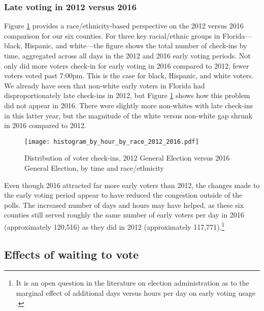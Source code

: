 \documentclass[12pt,titlepage]{article}
\begin{document}
\subsubsection*{Late voting in 2012 versus 2016}

Figure \ref{fig:race2012and2016} provides a race/ethnicity-based
perspective on the 2012 versus 2016 comparison for our six counties.
For three key racial/ethnic groups in Florida---black, Hispanic, and
white---the figure shows the total number of check-ins by time,
aggregated across all days in the 2012 and 2016 early voting periods.
Not only did more voters check-in for early voting in 2016 compared to
2012, fewer voters voted past 7:00pm. This is the case for black,
Hispanic, and white voters. We already have seen that non-white early
voters in Florida had disproportionately late check-ins in 2012, but
Figure \ref{fig:race2012and2016} shows how this problem did not appear
in 2016. There were slightly more non-whites with late check-ins in
this latter year, but the magnitude of the white versus non-white gap
shrunk in 2016 compared to 2012.

\begin{figure}[!ht]
  \caption{Distribution of voter check-ins, 2012 General Election
    versus 2016 General Election, by time and race/ethnicity}
  \label{fig:race2012and2016}
  \centering
  \centering\texttt{[image: histogram\_by\_hour\_by\_race\_2012\_2016.pdf]}
\end{figure}

Even though 2016 attracted far more early voters than 2012, the
changes made to the early voting period appear to have reduced the
congestion outside of the polls. The increased number of days and
hours may have helped, as these six counties still served roughly the
same number of early voters per day in 2016 (approximately 120,516) as
they did in 2012 (approximately 117,771).\footnote{It is an open
  question in the literature on election administration as to the
  marginal effect of additional days versus hours per day on early
  voting usage \citep[e.g.,][]{walkeretal:ncearly}.}



\subsection*{Effects of waiting to vote}
\end{document}
